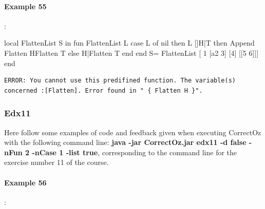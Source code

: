 \documentclass[11pt,a4paper,twoside,openright]{report}
\begin{document}
\paragraph{Example 55}:

\begin{OZ}
local FlattenList S in
	fun {FlattenList L}
		case L of nil then L
					[]H|T then {Append {Flatten H}{Flatten 
T}}
				else H|{Flatten T}
		end
	end
	S= {FlattenList [ 1 [a2 3] [4] [[5 6]]]}
end
\end{OZ}


\begin{lstlisting}
ERROR: You cannot use this predifined function. The variable(s) concerned :[Flatten]. Error found in " { Flatten H }".
\end{lstlisting}


\subsubsection{Edx11}
Here follow some examples of code and feedback given when executing 
CorrectOz with the following command line: \textbf{java -jar CorrectOz.jar edx11 -d 
false -nFun 2 -nCase 1  -list true}, corresponding to the command line for the 
exercise number 11 of the course.

\paragraph{Example 56}:

\end{document}
